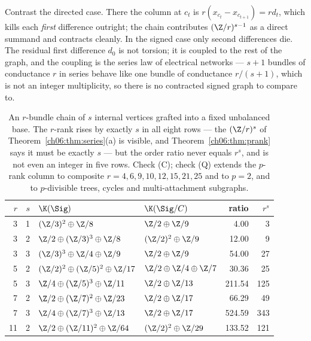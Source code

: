 Contrast the directed case. There the column at $c_t$ is $r(x_{c_t}-x_{c_{t+1}})=r d_t$,
which kills each \emph{first} difference outright; the chain contributes $(\Z/r)^{s-1}$ as a
direct summand and contracts cleanly. In the signed case only second differences die. The
residual first difference $d_0$ is not torsion; it is coupled to the rest of the graph, and
the coupling is the series law of electrical networks --- $s{+}1$ bundles of conductance $r$
in series behave like one bundle of conductance $r/(s{+}1)$, which is not an integer
multiplicity, so there is no contracted signed graph to compare to.

\begin{table}[t]
\centering
\begin{tabular}{rrllrr}
\toprule
$r$ & $s$ & $\K(\Sig)$ & $\K(\Sig/C)$ & ratio & $r^s$\\
\midrule
 3 & 1 & $(\Z/3)^2\oplus\Z/8$              & $\Z/2\oplus\Z/9$          &   4.00 &   3\\
 3 & 2 & $\Z/2\oplus(\Z/3)^3\oplus\Z/8$    & $(\Z/2)^2\oplus\Z/9$      &  12.00 &   9\\
 3 & 3 & $(\Z/3)^3\oplus\Z/4\oplus\Z/9$    & $\Z/2\oplus\Z/9$          &  54.00 &  27\\
 5 & 2 & $(\Z/2)^2\oplus(\Z/5)^2\oplus\Z/17$ & $\Z/2\oplus\Z/4\oplus\Z/7$ & 30.36 &  25\\
 5 & 3 & $\Z/4\oplus(\Z/5)^3\oplus\Z/11$   & $\Z/2\oplus\Z/13$         & 211.54 & 125\\
 7 & 2 & $\Z/2\oplus(\Z/7)^2\oplus\Z/23$   & $\Z/2\oplus\Z/17$         &  66.29 &  49\\
 7 & 3 & $\Z/4\oplus(\Z/7)^3\oplus\Z/13$   & $\Z/2\oplus\Z/17$         & 524.59 & 343\\
11 & 2 & $\Z/2\oplus(\Z/11)^2\oplus\Z/64$  & $(\Z/2)^2\oplus\Z/29$     & 133.52 & 121\\
\bottomrule
\end{tabular}
\caption{An $r$-bundle chain of $s$ internal vertices grafted into a fixed unbalanced base.
The $r$-rank rises by exactly $s$ in all eight rows --- the $(\Z/r)^s$ of
Theorem~\ref{ch06:thm:series}(a) is visible, and Theorem~\ref{ch06:thm:prank} says it must be exactly
$s$ --- but the order ratio never equals $r^s$, and is not even an integer in five rows.
Check (C); check (Q) extends the $p$-rank column to composite $r=4,6,9,10,12,15,21,25$ and
to $p=2$, and to $p$-divisible trees, cycles and multi-attachment subgraphs.}
\label{ch06:tab:series}
\end{table}

